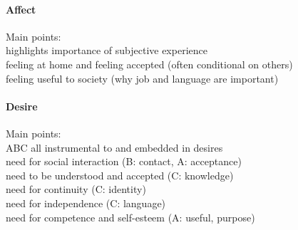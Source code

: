 \documentclass[nobib]{tufte-handout}
\begin{document}
\paragraph{Affect} Main points:\\
highlights importance of subjective experience\\
feeling at home and feeling accepted (often conditional on others)\\
feeling useful to society (why job and language are important)\\

\paragraph{Desire} Main points:\\
ABC all instrumental to and embedded in desires\\ 
need for social interaction (B: contact, A: acceptance)\\
need to be understood and accepted (C: knowledge)\\
need for continuity (C: identity)\\
need for independence (C: language)\\
need for competence and self-esteem (A: useful, purpose)
\end{document}
